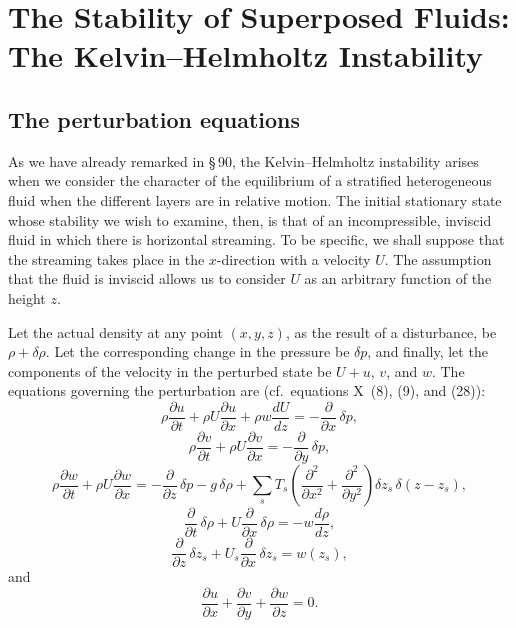 \chapter{The Stability of Superposed Fluids: The Kelvin--Helmholtz Instability}
\label{ch:11}


\section{The perturbation equations}\label{sec:100}

As we have already remarked in \S\,90, the Kelvin--Helmholtz instability arises when we consider the character of the equilibrium of a stratified heterogeneous fluid when the different layers are in relative motion. The initial stationary state whose stability we wish to examine, then, is that of an incompressible, inviscid fluid in which there is horizontal streaming. To be specific, we shall suppose that the streaming takes place in the $x$-direction with a velocity $U$. The assumption that the fluid is inviscid allows us to consider $U$ as an arbitrary function of the height $z$.

Let the actual density at any point $(x,y,z)$, as the result of a disturbance, be $\rho+\delta\rho$. Let the corresponding change in the pressure be $\delta p$, and finally, let the components of the velocity in the perturbed state be $U+u$, $v$, and $w$. The equations governing the perturbation are (cf.\ equations X~(8), (9), and (28)):
\begin{equation}
\label{eq:11-1}
\rho\frac{\partial u}{\partial t}+\rho U\frac{\partial u}{\partial x}+\rho w\frac{dU}{dz} = -\frac{\partial}{\partial x}\,\delta p,
\end{equation}
\begin{equation}
\label{eq:11-2}
\rho\frac{\partial v}{\partial t}+\rho U\frac{\partial v}{\partial x} = -\frac{\partial}{\partial y}\,\delta p,
\end{equation}
\begin{equation}
\label{eq:11-3}
\rho\frac{\partial w}{\partial t}+\rho U\frac{\partial w}{\partial x} = -\frac{\partial}{\partial z}\,\delta p - g\,\delta\rho + \sum_s T_s\!\left(\frac{\partial^2}{\partial x^2}+\frac{\partial^2}{\partial y^2}\right)\!\delta z_s\,\delta(z-z_s),
\end{equation}
\begin{equation}
\label{eq:11-4}
\frac{\partial}{\partial t}\,\delta\rho + U\frac{\partial}{\partial x}\,\delta\rho = -w\frac{d\rho}{dz},
\end{equation}
\begin{equation}
\label{eq:11-5}
\frac{\partial}{\partial z}\,\delta z_s + U_s\frac{\partial}{\partial x}\,\delta z_s = w(z_s),
\end{equation}
and
\begin{equation}
\label{eq:11-6}
\frac{\partial u}{\partial x}+\frac{\partial v}{\partial y}+\frac{\partial w}{\partial z} = 0.
\end{equation}

